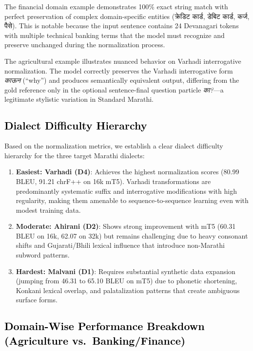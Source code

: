 The financial domain example demonstrates 100\% exact string match with perfect preservation of complex domain-specific entities (क्रेडिट कार्ड, डेबिट कार्ड, कर्ज, पैसे). This is notable because the input sentence contains 24 Devanagari tokens with multiple technical banking terms that the model must recognize and preserve unchanged during the normalization process.

The agricultural example illustrates nuanced behavior on Varhadi interrogative normalization. The model correctly preserves the Varhadi interrogative form \emph{काऊन} (``why'') and produces semantically equivalent output, differing from the gold reference only in the optional sentence-final question particle \emph{का?}---a legitimate stylistic variation in Standard Marathi.

\subsection{\textcolor{black}{Dialect Difficulty Hierarchy}}

Based on the normalization metrics, we establish a clear dialect difficulty hierarchy for the three target Marathi dialects:

\begin{enumerate}
    \item \textbf{Easiest: Varhadi (D4)}: Achieves the highest normalization scores (80.99 BLEU, 91.21 chrF++ on 16k mT5). Varhadi transformations are predominantly systematic suffix and interrogative modifications with high regularity, making them amenable to sequence-to-sequence learning even with modest training data.
    \item \textbf{Moderate: Ahirani (D2)}: Shows strong improvement with mT5 (60.31 BLEU on 16k, 62.07 on 32k) but remains challenging due to heavy consonant shifts and Gujarati/Bhili lexical influence that introduce non-Marathi subword patterns.
    \item \textbf{Hardest: Malvani (D1)}: Requires substantial synthetic data expansion (jumping from 46.31 to 65.10 BLEU on mT5) due to phonetic shortening, Konkani lexical overlap, and palatalization patterns that create ambiguous surface forms.
\end{enumerate}

\subsection{\textcolor{black}{Domain-Wise Performance Breakdown (Agriculture vs.\ Banking/Finance)}}

